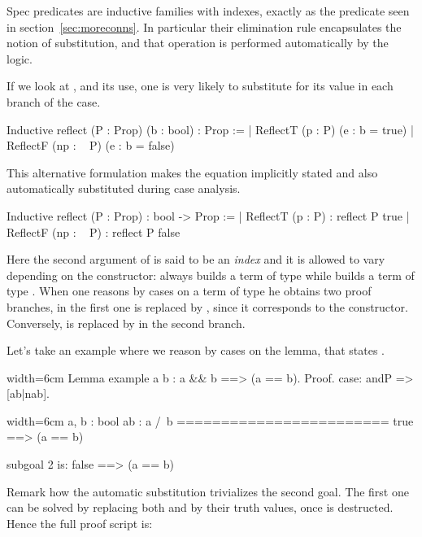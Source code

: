 Spec predicates are inductive families with indexes, exactly
as the  predicate seen in section~\ref{sec:moreconns}.
In particular their elimination rule encapsulates the notion
of substitution, and that operation is performed automatically by
the logic.

If we look at , and its use, one is very likely to substitute 
for its value in each branch of the case.

\begin{coq}{}{}
Inductive reflect (P : Prop) (b : bool) : Prop :=
| ReflectT (p : P)    (e : b = true)
| ReflectF (np : ~ P) (e : b = false)
\end{coq}

This alternative formulation makes the equation implicitly stated and
also automatically substituted during case analysis.

\begin{coq}{}{}
Inductive reflect (P : Prop) : bool -> Prop :=
| ReflectT (p : P)    : reflect P true
| ReflectF (np : ~ P) : reflect P false
\end{coq}

Here the second argument of  is said to be an \emph{index}
and it is allowed to vary depending on the constructor:  always
builds a term of type  while  builds
a term of type .  When one reasons
by cases on a term of type  he obtains two proof
branches, in the first one  is replaced by , since it
corresponds to the  constructor.  Conversely,
 is replaced by  in the second branch.

Let's take an example where we reason by cases on the  lemma,
that states .

\begin{coq-left}{}{width=6cm}
Lemma example a b :
  a && b ==> (a == b).
Proof.
case: andP => [ab|nab].
$~$
$~$
\end{coq-left}
\begin{coqout-right}{}{width=6cm}
a, b : bool
ab : a /\ b
========================
true ==> (a == b)

subgoal 2 is:
false ==> (a == b)
\end{coqout-right}

Remark how the automatic substitution trivializes the
second goal.  The first one can be solved by replacing
both  and  by their truth values, once 
is destructed.  Hence the full proof script is:

